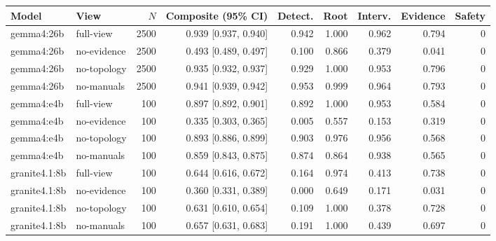 \begin{tabular}{llrrrrrrr}
\toprule
Model & View & $N$ & Composite (95\% CI) & Detect. & Root & Interv. & Evidence & Safety \\
\midrule
gemma4:26b & full-view & 2500 & 0.939 [0.937, 0.940] & 0.942 & 1.000 & 0.962 & 0.794 & 0 \\
gemma4:26b & no-evidence & 2500 & 0.493 [0.489, 0.497] & 0.100 & 0.866 & 0.379 & 0.041 & 0 \\
gemma4:26b & no-topology & 2500 & 0.935 [0.932, 0.937] & 0.929 & 1.000 & 0.953 & 0.796 & 0 \\
gemma4:26b & no-manuals & 2500 & 0.941 [0.939, 0.942] & 0.953 & 0.999 & 0.964 & 0.793 & 0 \\
gemma4:e4b & full-view & 100 & 0.897 [0.892, 0.901] & 0.892 & 1.000 & 0.953 & 0.584 & 0 \\
gemma4:e4b & no-evidence & 100 & 0.335 [0.303, 0.365] & 0.005 & 0.557 & 0.153 & 0.319 & 0 \\
gemma4:e4b & no-topology & 100 & 0.893 [0.886, 0.899] & 0.903 & 0.976 & 0.956 & 0.568 & 0 \\
gemma4:e4b & no-manuals & 100 & 0.859 [0.843, 0.875] & 0.874 & 0.864 & 0.938 & 0.565 & 0 \\
granite4.1:8b & full-view & 100 & 0.644 [0.616, 0.672] & 0.164 & 0.974 & 0.413 & 0.738 & 0 \\
granite4.1:8b & no-evidence & 100 & 0.360 [0.331, 0.389] & 0.000 & 0.649 & 0.171 & 0.031 & 0 \\
granite4.1:8b & no-topology & 100 & 0.631 [0.610, 0.654] & 0.109 & 1.000 & 0.378 & 0.728 & 0 \\
granite4.1:8b & no-manuals & 100 & 0.657 [0.631, 0.683] & 0.191 & 1.000 & 0.439 & 0.697 & 0 \\
\bottomrule
\end{tabular}
